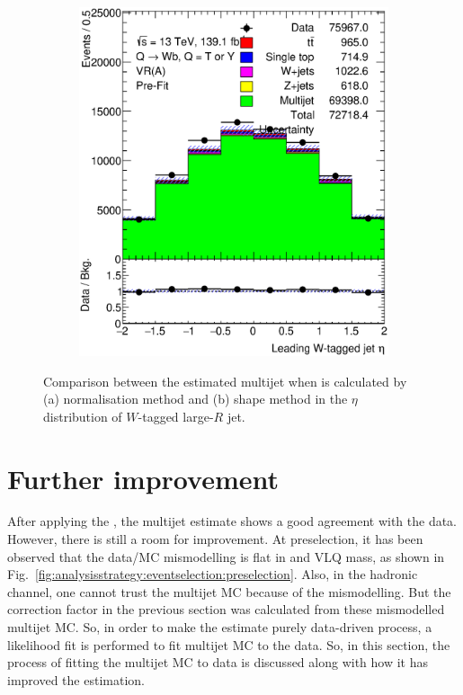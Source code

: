 \begin{figure}[hbt!]
\begin{subfigure}{.35\textwidth}
		\includegraphics[width=\linewidth,height=\textheight,keepaspectratio]{figs/chapter5/prefitbinbybin/VR_B_ljet_eta.eps}
		\caption{}
		\label{fig:abcd:correctionfactor:bin:ljet_eta}
	\end{subfigure}
	\caption{Comparison between the estimated multijet when \R is calculated by (a) normalisation method and (b) shape method in the $\eta$ distribution of $W$-tagged large-$R$ jet.}
	\label{fig:abcd:correctionfactor:ljet_eta}
\end{figure}

\clearpage
\section{Further improvement}
\label{sec:abcd:furtherimprovement}
After applying the \R, the multijet estimate shows a good agreement with the data. However, there is still a room for improvement. At preselection, it has been observed that the data/MC mismodelling is flat in \pt and VLQ mass, as shown in Fig.\ \ref{fig:analysisstrategy:eventselection:preselection}. Also, in the hadronic channel, one cannot trust the multijet MC  because of the mismodelling. But the correction factor in the previous section was calculated from these mismodelled multijet MC. So, in order to make the estimate purely data-driven process, a likelihood fit is performed to fit multijet MC to the data. So, in this section, the process of fitting the multijet MC to data is discussed along with how it has improved the estimation.

